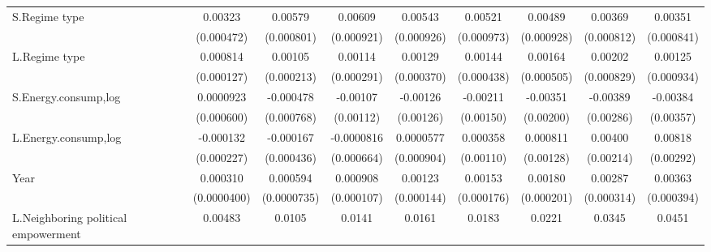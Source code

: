 \begin{table}[htbp]
\begin{tabular}{l*{8}{c}}
S.Regime type       &     0.00323\sym{***}&     0.00579\sym{***}&     0.00609\sym{***}&     0.00543\sym{***}&     0.00521\sym{***}&     0.00489\sym{***}&     0.00369\sym{***}&     0.00351\sym{***}\\
                    &  (0.000472)         &  (0.000801)         &  (0.000921)         &  (0.000926)         &  (0.000973)         &  (0.000928)         &  (0.000812)         &  (0.000841)         \\
[1em]
L.Regime type       &    0.000814\sym{***}&     0.00105\sym{***}&     0.00114\sym{***}&     0.00129\sym{***}&     0.00144\sym{***}&     0.00164\sym{***}&     0.00202\sym{**} &     0.00125         \\
                    &  (0.000127)         &  (0.000213)         &  (0.000291)         &  (0.000370)         &  (0.000438)         &  (0.000505)         &  (0.000829)         &  (0.000934)         \\
[1em]
S.Energy.consump,log&   0.0000923         &   -0.000478         &    -0.00107         &    -0.00126         &    -0.00211         &    -0.00351\sym{*}  &    -0.00389         &    -0.00384         \\
                    &  (0.000600)         &  (0.000768)         &   (0.00112)         &   (0.00126)         &   (0.00150)         &   (0.00200)         &   (0.00286)         &   (0.00357)         \\
[1em]
L.Energy.consump,log&   -0.000132         &   -0.000167         &  -0.0000816         &   0.0000577         &    0.000358         &    0.000811         &     0.00400\sym{*}  &     0.00818\sym{***}\\
                    &  (0.000227)         &  (0.000436)         &  (0.000664)         &  (0.000904)         &   (0.00110)         &   (0.00128)         &   (0.00214)         &   (0.00292)         \\
[1em]
Year                &    0.000310\sym{***}&    0.000594\sym{***}&    0.000908\sym{***}&     0.00123\sym{***}&     0.00153\sym{***}&     0.00180\sym{***}&     0.00287\sym{***}&     0.00363\sym{***}\\
                    & (0.0000400)         & (0.0000735)         &  (0.000107)         &  (0.000144)         &  (0.000176)         &  (0.000201)         &  (0.000314)         &  (0.000394)         \\
[1em]
L.Neighboring political empowerment&     0.00483         &      0.0105         &      0.0141         &      0.0161         &      0.0183         &      0.0221         &      0.0345         &      0.0451         \\

\end{tabular}
\end{table}
